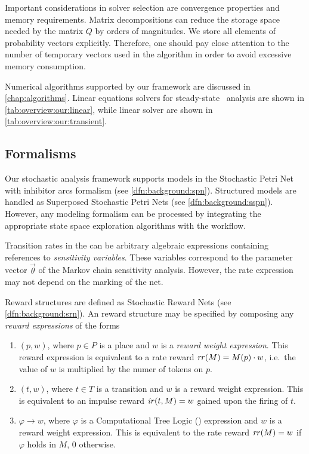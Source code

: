 \begin{itemize}
  Important considerations in solver selection are convergence
  properties and memory requirements. Matrix decompositions
  can reduce the storage space needed by the matrix $Q$ by orders of
  magnitudes. We store all elements of probability vectors
  explicitly. Therefore, one should pay close attention to the number
  of temporary vectors used in the algorithm in order to avoid
  excessive memory consumption.

  Numerical algorithms supported by our framework are discussed in
  \cref{chap:algorithms}. Linear equations solvers for steady-state
  \CTMC\ analysis are shown in \cref{tab:overview:our:linear}, while
  linear solver are shown in \cref{tab:overview:our:transient}.
\end{itemize}

\subsection{Formalisms}

Our stochastic analysis framework supports models in the Stochastic
Petri Net with inhibitor arcs formalism (see
\vref{dfn:background:spn}). Structured models are handled as
Superposed Stochastic Petri Nets (see
\vref{dfn:background:sspn}). However, any modeling formalism can be
processed by integrating the appropriate state space exploration
algorithms with the workflow.

Transition rates in the  can be arbitrary algebraic
expressions containing references to \emph{sensitivity
  variables}. These variables correspond to the parameter vector
$\vec{\theta}$ of the Markov chain sensitivity analysis. However, the rate
expression may not depend on the marking of the net.

Reward structures are defined as Stochastic Reward Nets (see
\vref{dfn:background:srn}). An  reward structure may be
specified by composing any \emph{reward expressions} of the forms
\begin{enumerate}
\item $(p, w)$, where $p \in P$ is a place and $w$ is a \emph{reward
    weight expression}. This reward expression is equivalent to
  a rate reward $\mathit{rr}(M) = M(p) \cdot w$, i.e.~the value of $w$
  is multiplied by the numer of tokens on $p$.
\item $(t, w)$, where $t \in T$ is a transition and $w$ is a reward
  weight expression. This is equivalent to an impulse reward
  $\mathit{ir}(t, M) = w$ gained upon the firing of $t$.
\item $\varphi \rightarrow w$, where $\varphi$ is a Computational Tree
  Logic () expression and $w$ is a reward weight
  expression. This is equivalent to the rate reward $\mathit{rr}(M) =
  w$ if $\varphi$ holds in $M$, $0$ otherwise.
\end{enumerate}

